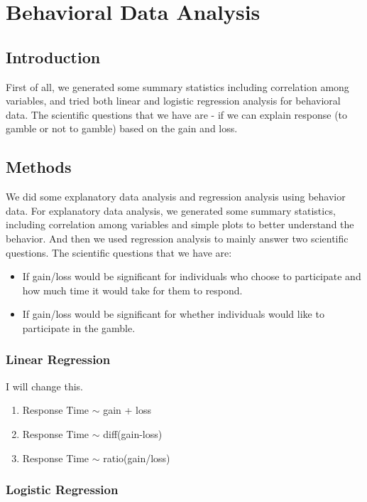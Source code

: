 \section{Behavioral Data Analysis}

\subsection{Introduction}
\noindent
First of all, we generated some summary statistics including correlation among variables, 
and tried both linear and logistic regression analysis for behavioral data. The scientific 
questions that we have are - if we can explain response (to gamble or not 
to gamble) based on the gain and loss.

\subsection{Methods}
\noindent
We did some explanatory data analysis and regression analysis using behavior 
data. For explanatory data analysis, we generated some summary statistics, 
including correlation among variables and simple plots to better understand 
the behavior. And then we used regression analysis to mainly answer two 
scientific questions. The scientific questions that we have are:
\begin{itemize}
\item If gain/loss would be significant for individuals who choose to 
participate and how much time it would take for them to respond.
\item If gain/loss would be significant for whether individuals would like to 
participate in the gamble. 
\end {itemize}

\subsubsection {Linear Regression}
I will change this.
\begin{enumerate}
\item  Response Time $\sim$ gain + loss
\item  Response Time $\sim$ diff(gain-loss)
\item  Response Time $\sim$ ratio(gain/loss)
\end {enumerate}

\subsubsection {Logistic Regression}
\noindent
